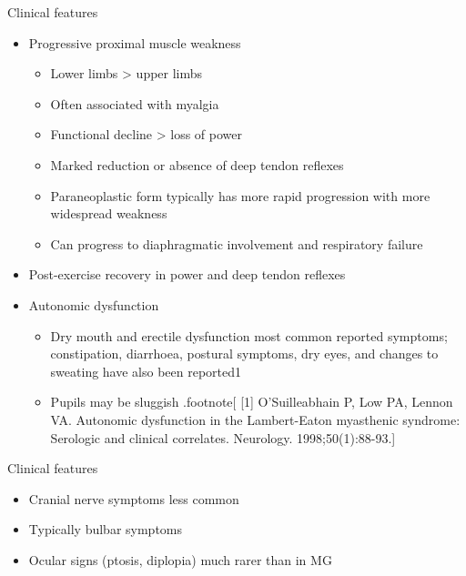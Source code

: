 \documentclass[
  ignorenonframetext,
]{beamer}
\providecommand{\tightlist}{%
  \setlength{\itemsep}{0pt}\setlength{\parskip}{0pt}}
\begin{document}
\begin{frame}{Clinical features}
\protect\hypertarget{clinical-features}{}
\begin{itemize}
\tightlist
\item
  Progressive proximal muscle weakness

  \begin{itemize}
  \tightlist
  \item
    Lower limbs \textgreater{} upper limbs
  \item
    Often associated with myalgia
  \item
    Functional decline \textgreater{} loss of power
  \item
    Marked reduction or absence of deep tendon reflexes
  \item
    Paraneoplastic form typically has more rapid progression with more
    widespread weakness
  \item
    Can progress to diaphragmatic involvement and respiratory failure
  \end{itemize}
\item
  Post-exercise recovery in power and deep tendon reflexes
\item
  Autonomic dysfunction

  \begin{itemize}
  \tightlist
  \item
    Dry mouth and erectile dysfunction most common reported symptoms;
    constipation, diarrhoea, postural symptoms, dry eyes, and changes to
    sweating have also been reported1
  \item
    Pupils may be sluggish .footnote{[} {[}1{]} O'Suilleabhain P, Low
    PA, Lennon VA. Autonomic dysfunction in the Lambert-Eaton myasthenic
    syndrome: Serologic and clinical correlates. Neurology.
    1998;50(1):88-93.{]}
  \end{itemize}
\end{itemize}
\end{frame}

\begin{frame}{Clinical features}
\protect\hypertarget{clinical-features-1}{}
\begin{itemize}
\tightlist
\item
  Cranial nerve symptoms less common
\item
  Typically bulbar symptoms
\item
  Ocular signs (ptosis, diplopia) much rarer than in MG
\end{itemize}
\end{frame}
\end{document}
